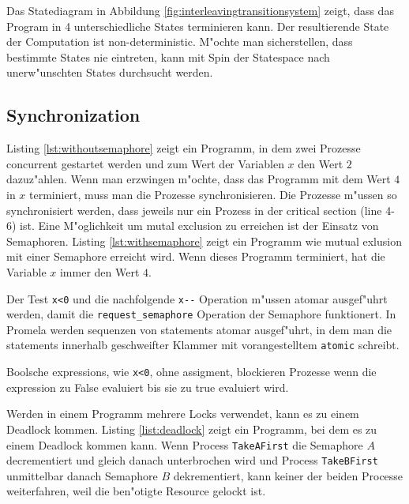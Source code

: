 \documentclass[a4paper, twoside]{article}
\begin{document}
Das Statediagram in Abbildung \ref{fig:interleavingtransitionsystem} zeigt, dass das Program in 4 unterschiedliche States terminieren kann. Der resultierende State der Computation ist non-deterministic. M"ochte man sicherstellen, dass bestimmte States nie eintreten, kann mit Spin der Statespace nach unerw"unschten States durchsucht werden.

\subsection{Synchronization}
\label{sec:synchronization}

Listing \ref{lst:withoutsemaphore} zeigt ein Programm, in dem zwei Prozesse concurrent gestartet werden und zum Wert der Variablen $x$ den Wert $2$ dazuz"ahlen. Wenn man erzwingen m"ochte, dass das Programm mit dem Wert $4$ in $x$ terminiert, muss man die Prozesse synchronisieren. Die Prozesse m"ussen so synchronisiert werden, dass jeweils nur ein Prozess in der critical section (line 4-6) ist. Eine M"oglichkeit um mutal exclusion zu erreichen ist der Einsatz von Semaphoren. Listing \ref{lst:withsemaphore} zeigt ein Programm wie mutual exlusion mit einer Semaphore erreicht wird. Wenn dieses Programm terminiert, hat die Variable $x$ immer den Wert $4$.



Der Test \verb|x<0| und die nachfolgende \verb|x--| Operation m"ussen atomar ausgef"uhrt werden, damit die \verb|request_semaphore| Operation der Semaphore funktionert. In Promela werden sequenzen von statements atomar ausgef"uhrt, in dem man die statements innerhalb geschweifter Klammer mit vorangestelltem \verb|atomic| schreibt.

Boolsche expressions, wie \verb|x<0|, ohne assigment, blockieren Prozesse wenn die expression zu False evaluiert bis sie zu true evaluiert wird.



Werden in einem Programm mehrere Locks verwendet, kann es zu einem Deadlock kommen. Listing \ref{list:deadlock} zeigt ein Programm, bei dem es zu einem Deadlock kommen kann. Wenn Process \verbTakeAFirst die Semaphore $A$ decrementiert und gleich danach unterbrochen wird und Process \verbTakeBFirst unmittelbar danach Semaphore $B$ dekrementiert, kann keiner der beiden Processe weiterfahren, weil die ben"otigte Resource gelockt ist.
\end{document}
